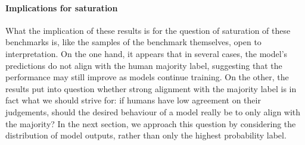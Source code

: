\paragraph{Implications for saturation}
What the implication of these results is for the question of saturation of these benchmarks is, like the samples of the benchmark themselves, open to interpretation.
On the one hand, it appears that in several cases, the model's predictions do not align with the human majority label, suggesting that the performance may still improve as models continue training.
On the other, the results put into question whether strong alignment with the majority label is in fact what we should strive for: if humans have low agreement on their judgements, should the desired behaviour of a model really be to only align with the majority?
In the next section, we approach this question by considering the distribution of model outputs, rather than only the highest probability label.

% 
% 



